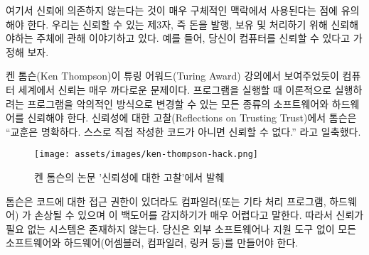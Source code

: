\begin{comment}
	Note that \textit{without relying on trust} is used in a very specific context
	here. We are talking about trusted third parties, i.e. other entities
	which you trust to produce, hold, and process your money. It is assumed,
	for example, that you can trust your computer.
\end{comment}
여기서 신뢰에 의존하지 않는다는 것이 매우 구체적인 맥락에서 사용된다는 점에 유의해야 한다.
우리는 신뢰할 수 있는 제3자, 즉 돈을 발행, 보유 및 처리하기 위해 신뢰해야하는 주체에 관해 이야기하고 있다.
예를 들어, 당신이 컴퓨터를 신뢰할 수 있다고 가정해 보자.

\begin{comment}
	As Ken Thompson showed in his Turing Award lecture, trust is an
	extremely tricky thing in the computational world. When running a
	program, you have to trust all kinds of software (and hardware) which,
	in theory, could alter the program you are trying to run in a malicious
	way. As Thompson summarized in his \textit{Reflections on Trusting Trust}:
	\enquote{The moral is obvious. You can't trust code that you did not totally
		create yourself.}~\cite{trusting-trust}
\end{comment}
켄 톰슨(Ken Thompson)이 튜링 어워드(Turing Award) 강의에서 보여주었듯이 컴퓨터 세계에서 신뢰는 매우 까다로운 문제이다.
프로그램을 실행할 때 이론적으로 실행하려는 프로그램을 악의적인 방식으로 변경할 수 있는 모든 종류의 소프트웨어와 하드웨어를 신뢰해야 한다.
신뢰성에 대한 고찰(Reflections on Trusting Trust)에서 톰슨은
\enquote{교훈은 명확하다. 스스로 직접 작성한 코드가 아니면 신뢰할 수 없다.}\cite{trusting-trust}
라고 일축했다.

\begin{figure}
	\texttt{[image: assets/images/ken-thompson-hack.png]}
	\caption{켄 톰슨의 논문 '신뢰성에 대한 고찰'에서 발췌}
	\label{fig:ken-thompson-hack}
\end{figure}

\begin{comment}
	Thompson demonstrated that even if you have access to the source code,
	your compiler --- or any other program-handling program or
	hardware --- could be compromised and detecting this backdoor would be
	very difficult. Thus, in practice, a truly \textit{trustless} system does not
	exist. You would have to create all your software \textit{and} all your
	hardware (assemblers, compilers, linkers, etc.) from scratch, without
	the aid of any external software or software-aided machinery.
\end{comment}
톰슨은 코드에 대한 접근 권한이 있더라도 컴파일러(또는 기타 처리 프로그램, 하드웨어)
가 손상될 수 있으며 이 백도어를 감지하기가 매우 어렵다고 말한다. 
따라서 신뢰가 필요 없는 시스템은 존재하지 않는다.
당신은 외부 소프트웨어나 지원 도구 없이 모든 소프트웨어와 하드웨어(어셈블러, 컴파일러, 링커 등)를 만들어야 한다.

